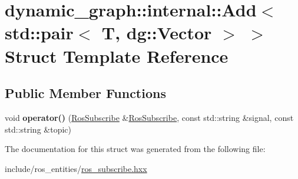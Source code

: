 \hypertarget{structdynamic__graph_1_1internal_1_1Add_3_01std_1_1pair_3_01T_00_01dg_1_1Vector_01_4_01_4}{}\section{dynamic\+\_\+graph\+:\+:internal\+:\+:Add$<$ std\+:\+:pair$<$ T, dg\+:\+:Vector $>$ $>$ Struct Template Reference}
\label{structdynamic__graph_1_1internal_1_1Add_3_01std_1_1pair_3_01T_00_01dg_1_1Vector_01_4_01_4}
\subsection*{Public Member Functions}
\begin{DoxyCompactItemize}
\item 
void {\bfseries operator()} (\hyperlink{classdynamic__graph_1_1RosSubscribe}{Ros\+Subscribe} \&\hyperlink{classdynamic__graph_1_1RosSubscribe}{Ros\+Subscribe}, const std\+::string \&signal, const std\+::string \&topic)\hypertarget{structdynamic__graph_1_1internal_1_1Add_3_01std_1_1pair_3_01T_00_01dg_1_1Vector_01_4_01_4_af6641e84d4c979827f56b5df1570b1a5}{}\label{structdynamic__graph_1_1internal_1_1Add_3_01std_1_1pair_3_01T_00_01dg_1_1Vector_01_4_01_4_af6641e84d4c979827f56b5df1570b1a5}

\end{DoxyCompactItemize}


The documentation for this struct was generated from the following file\+:\begin{DoxyCompactItemize}
\item 
include/ros\+\_\+entities/\hyperlink{ros__subscribe_8hxx}{ros\+\_\+subscribe.\+hxx}\end{DoxyCompactItemize}
